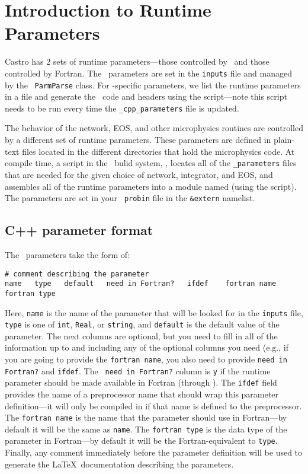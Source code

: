 \label{chapter:parameters}

\section{Introduction to Runtime Parameters}

Castro has 2 sets of runtime parameters---those controlled by
\cpp\ and those controlled by Fortran.  The \cpp\ parameters are set
in the {\tt inputs} file and managed by the \amrex\ {\tt ParmParse}
class.  For \castro-specific parameters, we list the runtime
parameters in a file  and generate the
\cpp\ code and headers using the  script---note
this script needs to be run every time the {\tt \_cpp\_parameters}
file is updated.

The behavior of the network, EOS, and other microphysics routines are
controlled by a different set of runtime parameters.  These parameters are defined
in plain-text files  located in the different
directories that hold the microphysics code.  At compile time, a
script in the \amrex\ bulid system, , locates all
of the {\tt \_parameters} files that are needed for the given choice
of network, integrator, and EOS, and assembles all of the runtime
parameters into a module named  (using the
 script).  The parameters are set in your {\tt
  probin} file in the {\tt \&extern} namelist.

\subsection{C++ parameter format}

The \cpp\ parameters take the form of:
\begin{verbatim}
# comment describing the parameter
name   type   default   need in Fortran?   ifdef    fortran name    fortran type
\end{verbatim}
Here, {\tt name} is the name of the parameter that will be looked for
in the {\tt inputs} file, {\tt type} is one of {\tt int}, {\tt Real},
or {\tt string}, and {\tt default} is the default value of the
parameter.  The next columns are optional, but you need to fill in all
of the information up to and including any of the optional columns you
need (e.g., if you are going to provide the {\tt fortran name}, you
also need to provide {\tt need in Fortran?} and {\tt ifdef}.  The {\tt
  need in Fortran?} column is {\tt y} if the runtime parameter should
be made available in Fortran (through ).
The {\tt ifdef} field provides the name of a preprocessor name that
should wrap this parameter definition---it will only be compiled in if
that name is defined to the preprocessor.  The {\tt fortran name} is
the name that the parameter should use in Fortran---by default it will
be the same as {\tt name}.  The {\tt fortran type} is the data type of
the parameter in Fortran---by default it will be the
Fortran-equivalent to {\tt type}.  Finally, any comment immediately
before the parameter definition will be used to generate the \LaTeX\ documentation
describing the parameters.



